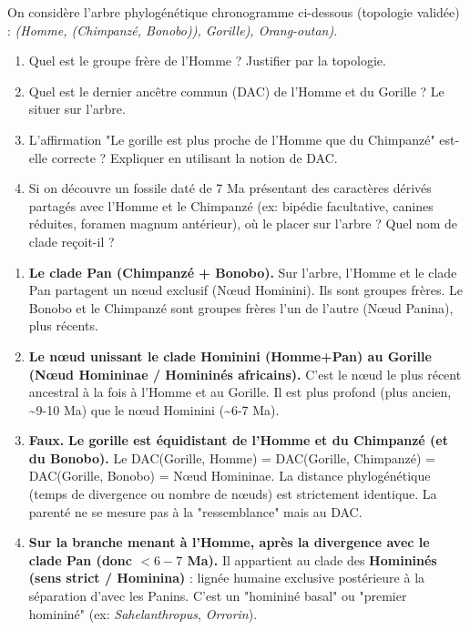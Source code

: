 \documentclass[11pt]{article}
\begin{document}
\begin{exercice}
On considère l'arbre phylogénétique chronogramme ci-dessous (topologie validée) :
\emph{(Homme, (Chimpanzé, Bonobo)), Gorille), Orang-outan)}.
\begin{enumerate}
    \item Quel est le groupe frère de l'Homme ? Justifier par la topologie.
    \item Quel est le dernier ancêtre commun (DAC) de l'Homme et du Gorille ? Le situer sur l'arbre.
    \item L'affirmation "Le gorille est plus proche de l'Homme que du Chimpanzé" est-elle correcte ? Expliquer en utilisant la notion de DAC.
    \item Si on découvre un fossile daté de 7 Ma présentant des caractères dérivés partagés avec l'Homme et le Chimpanzé (ex: bipédie facultative, canines réduites, foramen magnum antérieur), où le placer sur l'arbre ? Quel nom de clade reçoit-il ?
\end{enumerate}
\end{exercice}

\begin{corrige}
\begin{enumerate}
    \item \textbf{Le clade Pan (Chimpanzé + Bonobo).} Sur l'arbre, l'Homme et le clade Pan partagent un nœud exclusif (Nœud Hominini). Ils sont groupes frères. Le Bonobo et le Chimpanzé sont groupes frères l'un de l'autre (Nœud Panina), plus récents.
    \item \textbf{Le nœud unissant le clade Hominini (Homme+Pan) au Gorille (Nœud Homininae / Homininés africains).} C'est le nœud le plus récent ancestral à la fois à l'Homme et au Gorille. Il est plus profond (plus ancien, \textasciitilde 9-10 Ma) que le nœud Hominini (\textasciitilde 6-7 Ma).
    \item \textbf{Faux.} \textbf{Le gorille est équidistant de l'Homme et du Chimpanzé (et du Bonobo).} Le DAC(Gorille, Homme) = DAC(Gorille, Chimpanzé) = DAC(Gorille, Bonobo) = Nœud Homininae. La distance phylogénétique (temps de divergence ou nombre de nœuds) est strictement identique. La parenté ne se mesure pas à la "ressemblance" mais au DAC.
    \item \textbf{Sur la branche menant à l'Homme, après la divergence avec le clade Pan (donc $< 6-7$ Ma).} Il appartient au clade des \textbf{Homininés (sens strict / Hominina)} : lignée humaine exclusive postérieure à la séparation d'avec les Panins. C'est un "homininé basal" ou "premier homininé" (ex: \emph{Sahelanthropus}, \emph{Orrorin}).
\end{enumerate}
\end{corrige}
\end{document}
